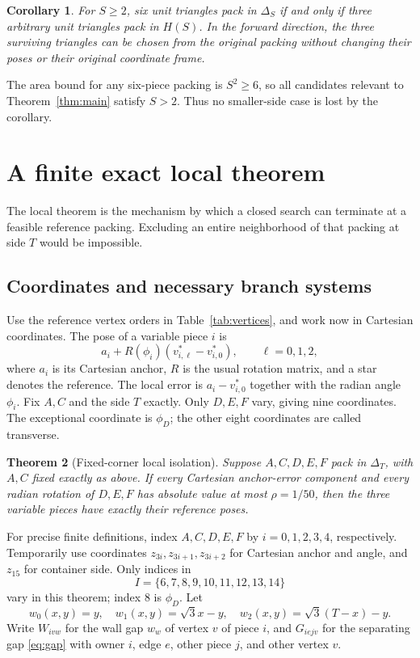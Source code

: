 \documentclass[11pt]{article}
\newtheorem{theorem}{Theorem}[section]
\newtheorem{corollary}[theorem]{Corollary}
\begin{document}
\begin{corollary}\label{cor:hexagon-reduction}
For $S\ge2$, six unit triangles pack in $\Delta_S$ if and only if three arbitrary unit triangles pack in $H(S)$. In the forward direction, the three surviving triangles can be chosen from the original packing without changing their poses or their original coordinate frame.
\end{corollary}

The area bound for any six-piece packing is $S^2\ge6$, so all candidates relevant to Theorem~\ref{thm:main} satisfy $S>2$. Thus no smaller-side case is lost by the corollary.

\section{A finite exact local theorem}\label{sec:local}

The local theorem is the mechanism by which a closed search can terminate at a feasible reference packing. Excluding an entire neighborhood of that packing at side $T$ would be impossible.

\subsection{Coordinates and necessary branch systems}

Use the reference vertex orders in Table~\ref{tab:vertices}, and work now in Cartesian coordinates. The pose of a variable piece $i$ is
\[
 a_i+R(\phi_i)(v_{i,\ell}^*-v_{i,0}^*),\qquad \ell=0,1,2,
\]
where $a_i$ is its Cartesian anchor, $R$ is the usual rotation matrix, and a star denotes the reference. The local error is $a_i-v_{i,0}^*$ together with the radian angle $\phi_i$. Fix $A,C$ and the side $T$ exactly. Only $D,E,F$ vary, giving nine coordinates. The exceptional coordinate is $\phi_D$; the other eight coordinates are called transverse.

\begin{theorem}[Fixed-corner local isolation]\label{thm:local}
Suppose $A,C,D,E,F$ pack in $\Delta_T$, with $A,C$ fixed exactly as above. If every Cartesian anchor-error component and every radian rotation of $D,E,F$ has absolute value at most $\rho=1/50$, then the three variable pieces have exactly their reference poses.
\end{theorem}

For precise finite definitions, index $A,C,D,E,F$ by $i=0,1,2,3,4$, respectively. Temporarily use coordinates $z_{3i},z_{3i+1},z_{3i+2}$ for Cartesian anchor and angle, and $z_{15}$ for container side. Only indices in
\[
 I=\{6,7,8,9,10,11,12,13,14\}
\]
vary in this theorem; index $8$ is $\phi_D$. Let
\[
 w_0(x,y)=y,\quad w_1(x,y)=\sqrt3x-y,\quad
 w_2(x,y)=\sqrt3(T-x)-y.
\]
Write $W_{ivw}$ for the wall gap $w_w$ of vertex $v$ of piece $i$, and $G_{iejv}$ for the separating gap \eqref{eq:gap} with owner $i$, edge $e$, other piece $j$, and other vertex $v$.
\end{document}
